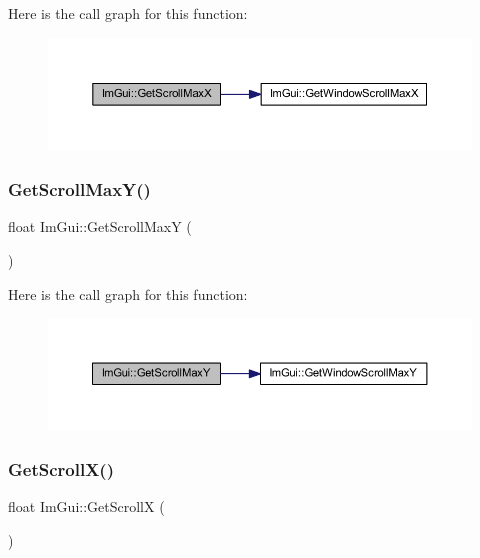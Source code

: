Here is the call graph for this function\+:
\nopagebreak
\begin{figure}[H]
\begin{center}
\leavevmode
\includegraphics[width=350pt]{namespace_im_gui_af472cb090157c22e65a0aa1662b9f3d0_cgraph}
\end{center}
\end{figure}
\mbox{\label{namespace_im_gui_ab34c0d5c63908a7ff50923151730f76a}} 
\subsubsection{\texorpdfstring{Get\+Scroll\+Max\+Y()}{GetScrollMaxY()}}
{\footnotesize\ttfamily float Im\+Gui\+::\+Get\+Scroll\+MaxY (\begin{DoxyParamCaption}{ }\end{DoxyParamCaption})}

Here is the call graph for this function\+:
\nopagebreak
\begin{figure}[H]
\begin{center}
\leavevmode
\includegraphics[width=350pt]{namespace_im_gui_ab34c0d5c63908a7ff50923151730f76a_cgraph}
\end{center}
\end{figure}
\mbox{\label{namespace_im_gui_a6f88335d87da3be81dc6e24cb1812923}} 
\subsubsection{\texorpdfstring{Get\+Scroll\+X()}{GetScrollX()}}
{\footnotesize\ttfamily float Im\+Gui\+::\+Get\+ScrollX (\begin{DoxyParamCaption}{ }\end{DoxyParamCaption})}

